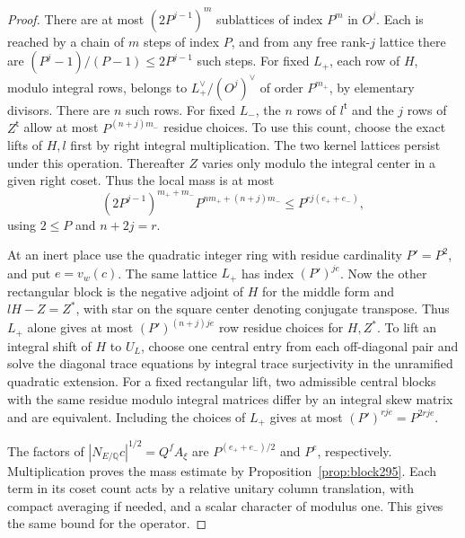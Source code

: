 \documentclass[a4paper,11pt]{article}
\theoremstyle{definition}
\theoremstyle{remark}
\numberwithin{equation}{section}
\begin{document}
\begin{proof}
There are at most \((2P^{j-1})^m\) sublattices of
index \(P^m\) in \(O^j\). Each is reached by a chain of
\(m\) steps of index \(P\), and from any free rank-\(j\)
lattice there are \((P^j-1)/(P-1)\le2P^{j-1}\) such
steps. For fixed \(L_+\), each row of \(H\), modulo
integral rows, belongs to \(L_+^\vee/(O^j)^\vee\)
of order \(P^{m_+}\), by elementary divisors.
There are \(n\) such rows. For fixed \(L_-\), the \(n\)
rows of \(l^{\mathsf t}\) and the \(j\) rows of
\(Z^{\mathsf t}\) allow at most \(P^{(n+j)m_-}\)
residue choices. To use this count, choose the exact
lifts of \(H,l\) first by right integral multiplication.
The two kernel lattices persist under this operation.
Thereafter \(Z\) varies only modulo the integral center
in a given right coset. Thus the local mass is at most
\[
  (2P^{j-1})^{m_++m_-}P^{n m_++(n+j)m_-}
       \le P^{rj(e_++e_-)} ,
\]
using \(2\le P\) and \(n+2j=r\).

At an inert place use the quadratic integer ring with
residue cardinality \(P'=P^2\), and put \(e=v_w(c)\).
The same lattice \(L_+\) has index \((P')^{je}\).
Now the other rectangular block is the negative adjoint
of \(H\) for the middle form and \(lH-Z=Z^*\), with
star on the square center denoting conjugate transpose.
Thus \(L_+\) alone gives at most
\((P')^{(n+j)je}\) row residue choices for \(H,Z^*\).
To lift an integral shift of \(H\) to \(U_L\), choose one
central entry from each off-diagonal pair and solve the
diagonal trace equations by integral trace surjectivity
in the unramified quadratic extension. For a fixed
rectangular lift, two admissible central blocks with
the same residue modulo integral matrices differ by an
integral skew matrix and are equivalent. Including
the choices of \(L_+\) gives at most
\((P')^{rje}=P^{2rje}\).

The factors of \(|N_{E/\mathbb Q}c|^{1/2}=Q^f A_\xi\)
are \(P^{(e_++e_-)/2}\) and \(P^e\), respectively.
Multiplication proves the mass estimate by
Proposition~\ref{prop:block295}. Each term in its
coset count acts by a relative unitary column translation,
with compact averaging if needed, and a scalar character
of modulus one. This gives the same bound for the operator.
\end{proof}
\end{document}

